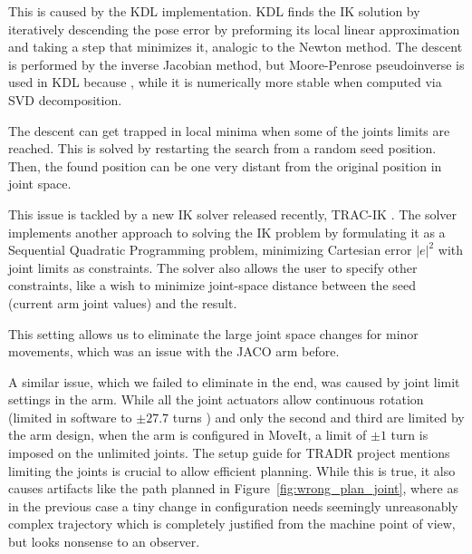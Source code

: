 \documentclass[buriama8_dp.tex]{subfiles}
\begin{document}
This is caused by the KDL implementation. KDL finds the IK solution by iteratively descending the pose error by preforming its local linear approximation\cite{tracik}  and taking a step that minimizes it, analogic to the Newton method. The descent is performed by the inverse Jacobian method, but Moore-Penrose pseudoinverse is used in KDL because , while it is numerically more stable when computed via SVD decomposition.

The descent can get trapped in local minima when some of the joints limits are reached. This is solved by restarting the search from a random seed position. Then, the found position can be one very distant from the original position in joint space.

This issue is tackled by a new IK solver released recently, TRAC-IK \cite{tracik}. The solver implements another approach to solving the IK problem by formulating it as a Sequential Quadratic Programming problem, minimizing Cartesian error \(|e|^2\) with joint limits as constraints. The solver also allows the user to specify other constraints, like a wish to minimize joint-space distance between the seed (current arm joint values) and the result.

This setting allows us to eliminate the large joint space changes for minor movements, which was an issue with the JACO arm before.

A similar issue, which we failed to eliminate in the end, was caused by joint limit settings in the arm. While all the joint actuators allow continuous rotation (limited in software to \(\pm 27.7\) turns \cite{jaco_spec}) and only the second and third are limited by the arm design, when the arm is configured in MoveIt, a limit of \(\pm 1\) turn is imposed on the unlimited joints. The setup guide for TRADR project mentions limiting the joints is crucial to allow efficient planning. While this is true, it also causes artifacts like the path planned in Figure~\ref{fig:wrong_plan_joint}, where as in the previous case a tiny change in configuration needs seemingly unreasonably complex trajectory which is completely justified from the machine point of view, but looks nonsense to an observer.
\end{document}
